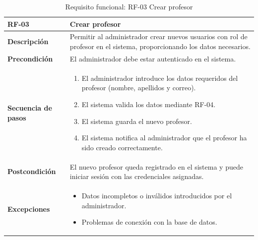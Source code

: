 \begin{table}[H]
\centering
\begin{tabularx}{\textwidth}{
  |>{\centering\arraybackslash}l
  |>{\centering\arraybackslash}X|}
\hline
\textbf{RF-03} & \textbf{Crear profesor} \\ \hline

\textbf{Descripción} & Permitir al administrador crear nuevos usuarios con rol de profesor en el sistema, proporcionando los datos necesarios. \\ \hline

\textbf{Precondición} & El administrador debe estar autenticado en el sistema. \\ \hline

\textbf{Secuencia de pasos} & 
\begin{enumerate}
  \item El administrador introduce los datos requeridos del profesor (nombre, apellidos y correo).
  \item El sistema valida los datos mediante RF-04.
  \item El sistema guarda el nuevo profesor.
  \item El sistema notifica al administrador que el profesor ha sido creado correctamente.
\end{enumerate} \\ \hline

\textbf{Postcondición} & El nuevo profesor queda registrado en el sistema y puede iniciar sesión con las credenciales asignadas. \\ \hline

\textbf{Excepciones} & 
\begin{itemize}
  \item Datos incompletos o inválidos introducidos por el administrador.
  \item Problemas de conexión con la base de datos.
\end{itemize} \\ \hline
\end{tabularx}
\caption{Requisito funcional: RF-03 Crear profesor}
\end{table}

